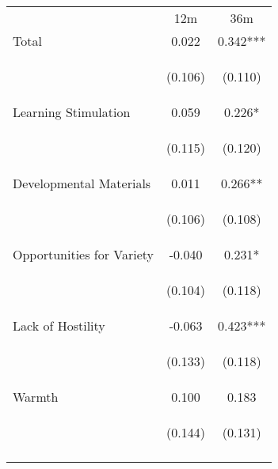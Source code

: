 \begin{tabular}{lcc}
\hline \noalign{\smallskip} & 12m & 36m\\
\noalign{\smallskip}\hline \noalign{\smallskip}Total & 0.022 & 0.342***\\
 & \begin{footnotesize}(0.106)\end{footnotesize} & \begin{footnotesize}(0.110)\end{footnotesize}\\
\noalign{\smallskip}Learning Stimulation & 0.059 & 0.226*\\
 & \begin{footnotesize}(0.115)\end{footnotesize} & \begin{footnotesize}(0.120)\end{footnotesize}\\
\noalign{\smallskip}Developmental Materials & 0.011 & 0.266**\\
 & \begin{footnotesize}(0.106)\end{footnotesize} & \begin{footnotesize}(0.108)\end{footnotesize}\\
\noalign{\smallskip}Opportunities for Variety & -0.040 & 0.231*\\
 & \begin{footnotesize}(0.104)\end{footnotesize} & \begin{footnotesize}(0.118)\end{footnotesize}\\
\noalign{\smallskip}Lack of Hostility & -0.063 & 0.423***\\
 & \begin{footnotesize}(0.133)\end{footnotesize} & \begin{footnotesize}(0.118)\end{footnotesize}\\
\noalign{\smallskip}Warmth & 0.100 & 0.183\\
 & \begin{footnotesize}(0.144)\end{footnotesize} & \begin{footnotesize}(0.131)\end{footnotesize}\\
\noalign{\smallskip}\hline\end{tabular}\\
